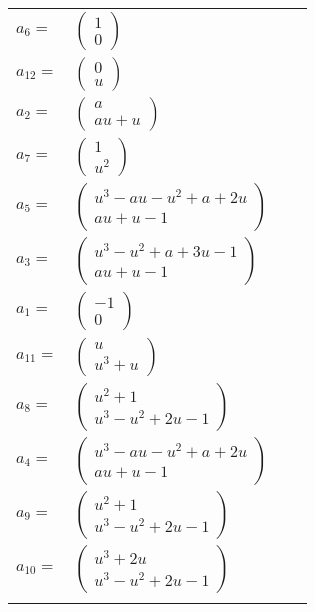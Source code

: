 \documentclass[1p]{elsarticle_modified}
\theoremstyle{definition}
\begin{document}
\begin{tabular}{m{7pt} m{180pt} m{7pt} m{180pt} }
\flushright $a_{6}=$&$\begin{pmatrix}1\\0\end{pmatrix}$ \\
\flushright $a_{12}=$&$\begin{pmatrix}0\\u\end{pmatrix}$ \\
\flushright $a_{2}=$&$\begin{pmatrix}a\\a u+u\end{pmatrix}$ \\
\flushright $a_{7}=$&$\begin{pmatrix}1\\u^2\end{pmatrix}$ \\
\flushright $a_{5}=$&$\begin{pmatrix}u^3- a u- u^2+a+2 u\\a u+u-1\end{pmatrix}$ \\
\flushright $a_{3}=$&$\begin{pmatrix}u^3- u^2+a+3 u-1\\a u+u-1\end{pmatrix}$ \\
\flushright $a_{1}=$&$\begin{pmatrix}-1\\0\end{pmatrix}$ \\
\flushright $a_{11}=$&$\begin{pmatrix}u\\u^3+u\end{pmatrix}$ \\
\flushright $a_{8}=$&$\begin{pmatrix}u^2+1\\u^3- u^2+2 u-1\end{pmatrix}$ \\
\flushright $a_{4}=$&$\begin{pmatrix}u^3- a u- u^2+a+2 u\\a u+u-1\end{pmatrix}$ \\
\flushright $a_{9}=$&$\begin{pmatrix}u^2+1\\u^3- u^2+2 u-1\end{pmatrix}$ \\
\flushright $a_{10}=$&$\begin{pmatrix}u^3+2 u\\u^3- u^2+2 u-1\end{pmatrix}$\\&\end{tabular}
\end{document}
